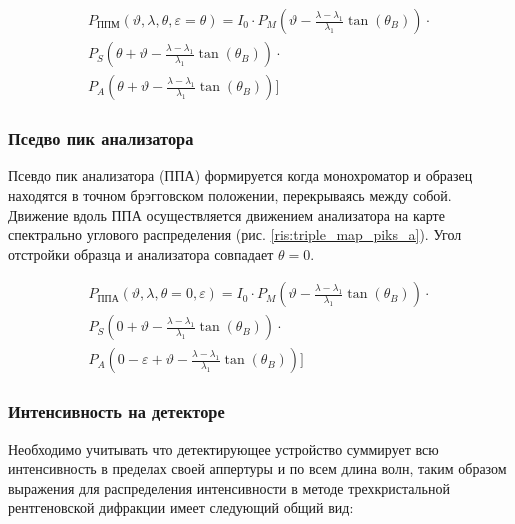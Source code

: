 \begin{eqnarray} \label{eq:triplr_spectra_angle_map_PPM}
  P_{\text{ППМ}}(\vartheta,\lambda,\theta,\varepsilon = \theta) =I_0\cdot
    P_M \left(\vartheta - \frac{\lambda - \lambda_1}{\lambda_1}\tan(\theta_B) \right) \cdot \nonumber \\
   P_S \left(\theta + \vartheta - \frac{\lambda - \lambda_1}{\lambda_1}\tan(\theta_B)\right)  \cdot  \nonumber \\
   P_A \left(\theta  + \vartheta - \frac{\lambda - \lambda_1}{\lambda_1}\tan(\theta_B)\right) \Bigg]
 \end{eqnarray}

 \subsubsection*{Пседво пик анализатора}
 Псевдо пик анализатора (ППА) формируется когда монохроматор и образец
 находятся в точном брэгговском положении, перекрываясь между собой. Движение вдоль ППА осуществляется
 движением анализатора  на карте спектрально углового распределения (рис. \ref{ris:triple_map_piks_a}).
   Угол отстройки образца и анализатора совпадает $\theta = 0$.

 \begin{eqnarray} \label{eq:triplr_spectra_angle_map_PPM}
   P_{\text{ППА}}(\vartheta,\lambda,\theta=0,\varepsilon) =I_0\cdot
     P_M \left(\vartheta - \frac{\lambda - \lambda_1}{\lambda_1}\tan(\theta_B) \right) \cdot \nonumber \\
    P_S \left(0 + \vartheta - \frac{\lambda - \lambda_1}{\lambda_1}\tan(\theta_B)\right)  \cdot  \nonumber \\
    P_A \left(0-\varepsilon  + \vartheta - \frac{\lambda - \lambda_1}{\lambda_1}\tan(\theta_B)\right) \Bigg]
  \end{eqnarray}


\subsubsection*{Интенсивность на детекторе}

Необходимо учитывать что детектирующее устройство суммирует всю интенсивность в пределах своей аппертуры и по всем длина волн,
таким образом выражения для распределения интенсивности в методе трехкристальной рентгеновской дифракции имеет следующий
общий вид:

